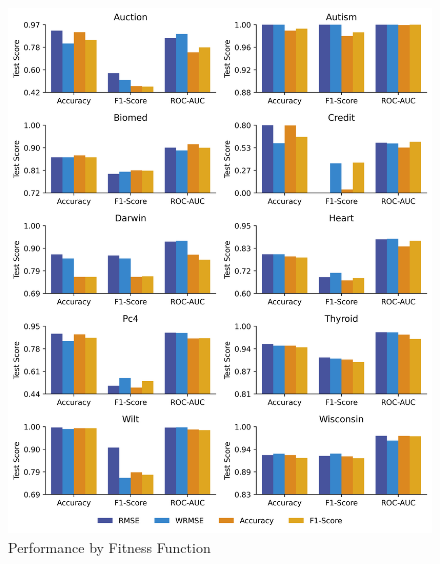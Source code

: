 
    \begin{figure}[H]
    \centering
    \includegraphics[width=\linewidth]{../Latex/Chapters/Figures/Results/fitness_performance.png}
    \caption{Performance by Fitness Function}
    \label{fig:fitness_performance}
    \end{figure}
    